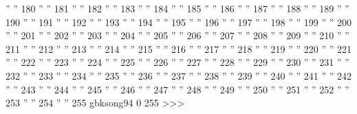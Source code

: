 '' ''         180
'' ''         181
'' ''         182
'' ''         183
'' ''         184
'' ''         185
'' ''         186
'' ''         187
'' ''         188
'' ''         189
'' ''         190
'' ''         191
'' ''         192
'' ''         193
'' ''         194
'' ''         195
'' ''         196
'' ''         197
'' ''         198
'' ''         199
'' ''         200
'' ''         201
'' ''         202
'' ''         203
'' ''         204
'' ''         205
'' ''         206
'' ''         207
'' ''         208
'' ''         209
'' ''         210
'' ''         211
'' ''         212
'' ''         213
'' ''         214
'' ''         215
'' ''         216
'' ''         217
'' ''         218
'' ''         219
'' ''         220
'' ''         221
'' ''         222
'' ''         223
'' ''         224
'' ''         225
'' ''         226
'' ''         227
'' ''         228
'' ''         229
'' ''         230
'' ''         231
'' ''         232
'' ''         233
'' ''         234
'' ''         235
'' ''         236
'' ''         237
'' ''         238
'' ''         239
'' ''         240
'' ''         241
'' ''         242
'' ''         243
'' ''         244
'' ''         245
'' ''         246
'' ''         247
'' ''         248
'' ''         249
'' ''         250
'' ''         251
'' ''         252
'' ''         253
'' ''         254
'' ''         255
gbksong94 0 255
>>>






\def\EndCJK{%
   \CloseCode
   \Configure{charset}{charset=iso-8859-1}
}



\def\GbkAlias#1#2{%
     \def\CURR{#1\ifnum\GBK<10 0\fi\GBK}
     \def\curfnt{#1}\def\tmp{gbkhei}\ifx \curfnt\tmp
       \leavevmode
           \special{t4ht>\CURR.log}%
            \special{t4ht=htfcss: 
                \CURR\space font-family: }\HChar{186}\HChar{218}%
            \HChar{204}\HChar{229}\special{t4ht=, sans-serif;}\hfill\break
            \special{t4ht<\CURR.log}
        \Needs{"mv \CURR.htf tmp; cat tmp \CURR.log > \CURR.htf; rm \CURR.log"}
      \fi
     \immediate\write\dbcs{\string\<\CURR\string\><<<}
     \immediate\write\dbcs{.gbksong\ifnum\GBK<10 0\fi\GBK}
     \immediate\write\dbcs{#2}
     \immediate\write\dbcs{>>>   
     \string\AddFont{\CURR}{alias/gbk/#1/\CURR}}
  \ifnum \GBK<94
    \HAdvance\GBK by 1 
    \def\next{\GbkAlias{#1}{#2}}%
    \expandafter\next
  \fi 
 }


